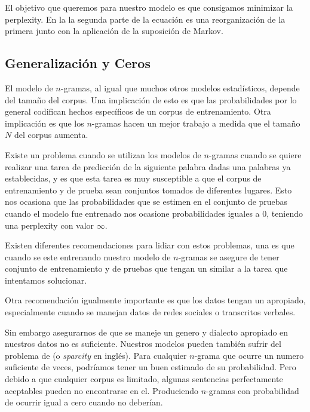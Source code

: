El objetivo que queremos para nuestro modelo es que consigamos minimizar la \gls{perplexity}. En la  la segunda parte de la ecuación es una reorganización de la primera junto con la aplicación de la suposición de Markov.

\subsection{Generalización y Ceros}
El modelo de $n$-gramas, al igual que muchos otros modelos estadísticos, depende del tamaño del \gls{corpus}. Una implicación de esto es que las probabilidades por lo general codifican hechos específicos de un \gls{corpus} de entrenamiento. Otra implicación es que los $n$-gramas hacen un mejor trabajo a medida que el tamaño $N$ del \gls{corpus} aumenta.

Existe un problema cuando se utilizan los modelos de $n$-gramas cuando se quiere realizar una tarea de predicción de la siguiente palabra dadas una palabras ya establecidas, y es que esta tarea es muy susceptible a que el \gls{corpus} de entrenamiento y de prueba sean conjuntos tomados de diferentes lugares. Esto nos ocasiona que las probabilidades que se estimen en el conjunto de pruebas cuando el modelo fue entrenado nos ocasione probabilidades iguales a $0$, teniendo una \gls{perplexity} con valor $\infty$.

Existen diferentes recomendaciones para lidiar con estos problemas, una es que cuando se este entrenando nuestro modelo de $n$-gramas se asegure de tener conjunto de entrenamiento y de pruebas que tengan un  similar a la tarea que intentamos solucionar.

Otra recomendación igualmente importante es que los datos tengan un  apropiado, especialmente cuando se manejan datos de redes sociales o transcritos verbales.

Sin embargo asegurarnos de que se maneje un genero y dialecto apropiado en nuestros datos no es suficiente. Nuestros modelos pueden también sufrir del problema de  (o \textsl{sparcity} en inglés). Para cualquier $n$-grama que ocurre un numero suficiente de veces, podríamos tener un buen estimado de su probabilidad. Pero debido a que cualquier \gls{corpus} es limitado, algunas sentencias perfectamente aceptables pueden no encontrarse en el. Produciendo $n$-gramas con probabilidad de ocurrir igual a cero cuando no deberían.

